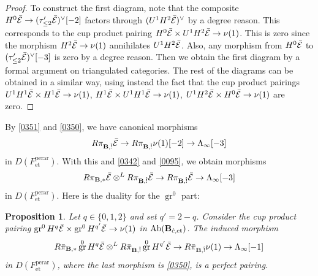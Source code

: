 \documentclass{amsart}
\newtheorem{Prop}[Thm]{Proposition}
\theoremstyle{remark}
\numberwithin{equation}{subsection}
\newcommand{\tensor}{\mathbin{\otimes}}
\newcommand{\et}{\mathrm{et}}
\newcommand{\perar}{\mathrm{perar}}
\newcommand{\alg}[1]{\mathbf{#1}}
\DeclareMathOperator{\Ab}{Ab}
\DeclareMathOperator{\gr}{gr}
\begin{document}
\begin{proof}
	To construct the first diagram,
	note that the composite
	$H^{0} \Bar{\mathcal{E}} \to (\tau_{\le 2}' \Bar{\mathcal{E}})^{\vee}[-2]$
	factors through $(U^{1} H^{2} \Bar{\mathcal{E}})^{\vee}$ by a degree reason.
	This corresponds to the cup product pairing
		$
					H^{0} \Bar{\mathcal{E}}
				\times
					U^{1} H^{2} \Bar{\mathcal{E}}
			\to
				\nu(1)
		$.
	This is zero since the morphism $H^{2} \Bar{\mathcal{E}} \to \nu(1)$ annihilates
	$U^{1} H^{2} \Bar{\mathcal{E}}$.
	Also, any morphism from $H^{0} \Bar{\mathcal{E}}$ to
	$(\tau_{\le 2}' \Bar{\mathcal{E}})^{\vee}[-3]$ is zero by a degree reason.
	Then we obtain the first diagram by a formal argument on triangulated categories.
	The rest of the diagrams can be obtained in a similar way,
	using instead the fact that the cup product pairings
		$
					U^{1} H^{1} \Bar{\mathcal{E}}
				\times
					H^{1} \Bar{\mathcal{E}}
			\to
				\nu(1)
		$,
		$
					H^{1} \Bar{\mathcal{E}}
				\times
					U^{1} H^{1} \Bar{\mathcal{E}}
			\to
				\nu(1)
		$,
		$
					U^{1} H^{2} \Bar{\mathcal{E}}
				\times
					H^{0} \Bar{\mathcal{E}}
			\to
				\nu(1)
		$
	are zero.
\end{proof}

By \eqref{0351} and \eqref{0350},
we have canonical morphisms
	\begin{equation} \label{0359}
			R \pi_{\alg{B}, \Hat{!}} \Bar{\mathcal{E}}
		\to
			R \pi_{\alg{B}, \Hat{!}} \nu(1)[-2]
		\to
			\Lambda_{\infty}[-3]
	\end{equation}
in $D(F^{\perar}_{\et})$.
With this and \eqref{0342} and \eqref{0095},
we obtain morphisms
	\[
				R \pi_{\alg{B}, \ast} \Bar{\mathcal{E}}
			\tensor^{L}
				R \pi_{\alg{B}, \Hat{!}} \Bar{\mathcal{E}}
		\to
			R \pi_{\alg{B}, \Hat{!}} \Bar{\mathcal{E}}
		\to
			\Lambda_{\infty}[-3]
	\]
in $D(F^{\perar}_{\et})$.
Here is the duality for the $\gr^{0}$ part:

\begin{Prop} \label{0098}
	Let $q \in \{0, 1, 2\}$ and set $q' = 2 - q$.
	Consider the cup product pairing
	$\gr^{0} H^{q} \Bar{\mathcal{E}} \times \gr^{0} H^{q'} \Bar{\mathcal{E}} \to \nu(1)$
	in $\Ab(\alg{B}_{\Hat{c}, \et})$.
	The induced morphism
		\[
					R \Bar{\pi}_{\alg{B}, \ast} \gr^{0} H^{q} \Bar{\mathcal{E}}
				\tensor^{L}
					R \Bar{\pi}_{\alg{B}, \Hat{!}} \gr^{0} H^{q'} \Bar{\mathcal{E}}
			\to
				R \Bar{\pi}_{\alg{B}, \Hat{!}} \nu(1)
			\to
				\Lambda_{\infty}[-1]
		\]
	in $D(F^{\perar}_{\et})$,
	where the last morphism is \eqref{0350},
	is a perfect pairing.
\end{Prop}
\end{document}
